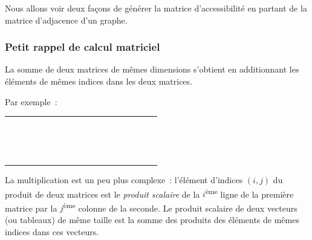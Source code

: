 			Nous allons voir deux façons de générer la matrice d'accessibilité 
			en partant de la matrice d'adjacence d'un graphe.

		\subsubsection{Petit rappel de calcul matriciel}

			La somme de deux matrices de mêmes dimensions s'obtient en 
			additionnant les éléments de mêmes indices dans les deux
			matrices.
			
			Par exemple~:

			\begin{center}
				\tablefirsthead{}
				\tablehead{}
				\tabletail{}
				\tablelasttail{}
				\begin{supertabular}{|m{0.601cm}|m{0.601cm}|m{0.601cm}|m{0.601cm}m{0.601cm}m{0.601cm}|m{0.601cm}|m{0.601cm}|m{0.601cm}|m{0.601cm}m{0.601cm}m{0.601cm}|m{0.601cm}|m{0.601cm}|m{0.61800003cm}|}
				\hhline{---~~~---~~~---}
				 &
				 &
				 &
				~
				 &
				~
				 &
				~
				 &
				 &
				 &
				 &
				~
				 &
				~
				 &
				~
				 &
				 &
				 &
				\centering{}\\\hhline{---~~~---~~~---}
				 &
				 &
				 &
				~
				 &
				\centering{ +} &
				~
				 &
				 &
				 &
				 &
				~
				 &
				\centering{ =} &
				~
				 &
				 &
				 &
				\centering{}\\\hhline{---~~~---~~~---}
				 &
				 &
				 &
				~
				 &
				~
				 &
				~
				 &
				 &
				 &
				 &
				~
				 &
				~
				 &
				~
				 &
				 &
				 &
				\centering{}\\\hhline{---~~~---~~~---}
				\end{supertabular}
			\end{center}

			La multiplication est un peu plus complexe~: 
			l'élément d'indices $(i, j)$ du produit de deux matrices
			est le \textit{produit scalaire} de la $i$\textsuperscript{ème} 
			ligne de la première matrice par la $j$\textsuperscript{ème} 
			colonne de la seconde. Le produit scalaire de deux vecteurs 
			(ou tableaux) de même taille est la somme des produits des 
			éléments de mêmes indices dans ces vecteurs. 
			
